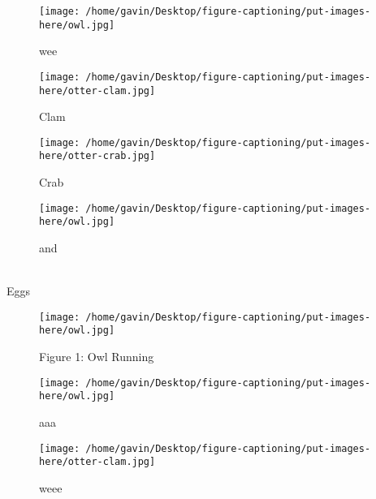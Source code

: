 
                \begin{figure}
                  \caption{wee}
                  \begin{center}
                    \texttt{[image: /home/gavin/Desktop/figure-captioning/put-images-here/owl.jpg]}
                    \label{fig:owl}
                  \end{center}
                \end{figure}
                \begin{figure}
                  \caption{Clam}
                  \begin{center}
                    \texttt{[image: /home/gavin/Desktop/figure-captioning/put-images-here/otter-clam.jpg]}
                    \label{fig:otter-clam}
                  \end{center}
                \end{figure}
                \begin{figure}
                  \caption{Crab}
                  \begin{center}
                    \texttt{[image: /home/gavin/Desktop/figure-captioning/put-images-here/otter-crab.jpg]}
                    \label{fig:otter-crab}
                  \end{center}
                \end{figure}
\begin{figure}
\caption{and}
\begin{center}
\texttt{[image: /home/gavin/Desktop/figure-captioning/put-images-here/owl.jpg]}
\label{fig:owl}
\end{center}
\end{figure}
\\Eggs
\begin{figure}
\caption{Figure 1: Owl Running}
\begin{center}
\texttt{[image: /home/gavin/Desktop/figure-captioning/put-images-here/owl.jpg]}
\label{fig:owl}
\end{center}
\end{figure}
\begin{figure}
\caption{aaa}
\begin{center}
\texttt{[image: /home/gavin/Desktop/figure-captioning/put-images-here/owl.jpg]}
\label{fig:owl}
\end{center}
\end{figure}
\begin{figure}
\caption{weee}
\begin{center}
\texttt{[image: /home/gavin/Desktop/figure-captioning/put-images-here/otter-clam.jpg]}
\label{fig:otter-clam}
\end{center}
\end{figure}
